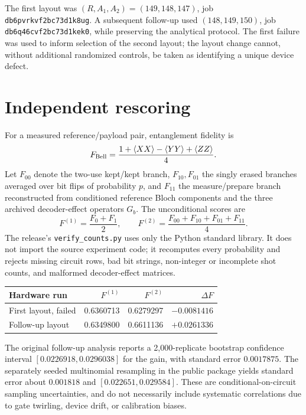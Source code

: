 \documentclass[11pt]{article}
\begin{document}
The first layout was $(R,A_1,A_2)=(149,148,147)$, job \texttt{db6pvrkvf2bc73d1k8ug}. A subsequent follow-up used $(148,149,150)$, job \texttt{db6q46cvf2bc73d1kek0}, while preserving the analytical protocol. The first failure was used to inform selection of the second layout; the layout change cannot, without additional randomized controls, be taken as identifying a unique device defect.

\section{Independent rescoring}
For a measured reference/payload pair, entanglement fidelity is
\begin{equation}
F_{\rm Bell}=\frac{1+\langle XX\rangle-\langle YY\rangle+\langle ZZ\rangle}{4}.
\end{equation}
Let $F_{00}$ denote the two-use kept/kept branch, $F_{10},F_{01}$ the singly erased branches averaged over bit flips of probability $p$, and $F_{11}$ the measure/prepare branch reconstructed from conditioned reference Bloch components and the three archived decoder-effect operators $G_b$. The unconditional scores are
\begin{equation}
F^{(1)}=\frac{F_0+F_1}{2},\qquad F^{(2)}=\frac{F_{00}+F_{10}+F_{01}+F_{11}}{4}.
\end{equation}
The release's \texttt{verify\_counts.py} uses only the Python standard library. It does not import the source experiment code; it recomputes every probability and rejects missing circuit rows, bad bit strings, non-integer or incomplete shot counts, and malformed decoder-effect matrices.

\begin{center}\begin{tabular}{lrrr}\toprule
Hardware run & $F^{(1)}$ & $F^{(2)}$ & $\Delta F$\\\midrule
First layout, failed & 0.6360713 & 0.6279297 & $-0.0081416$\\
Follow-up layout & 0.6349800 & 0.6611136 & $+0.0261336$\\\bottomrule
\end{tabular}\end{center}
The original follow-up analysis reports a 2,000-replicate bootstrap confidence interval $[0.0226918,0.0296038]$ for the gain, with standard error $0.0017875$. The separately seeded multinomial resampling in the public package yields standard error about $0.001818$ and $[0.022651,0.029584]$. These are conditional-on-circuit sampling uncertainties, and do not necessarily include systematic correlations due to gate twirling, device drift, or calibration biases.
\end{document}
